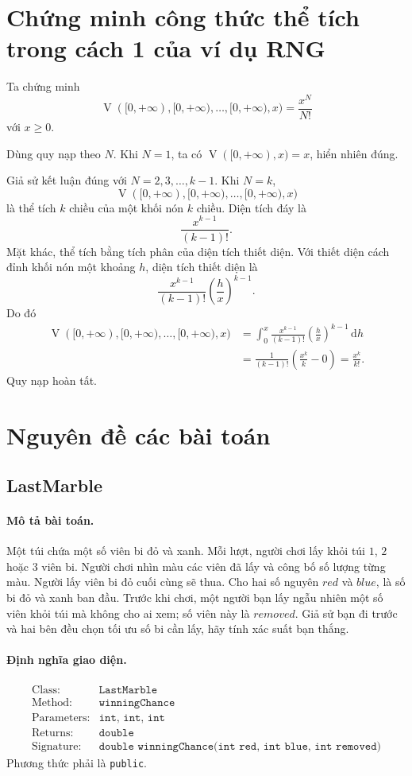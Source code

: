 \documentclass[11pt]{article}
\newcommand{\dd}{\,\mathrm{d}}
\newcommand{\Vol}{\operatorname{V}}
\begin{document}
\section{Chứng minh công thức thể tích trong cách 1 của ví dụ RNG}

Ta chứng minh
\[
  \Vol([0,+\infty),[0,+\infty),\ldots,[0,+\infty),x)
  =\frac{x^N}{N!}
\]
với \(x\ge 0\).

Dùng quy nạp theo \(N\). Khi \(N=1\), ta có \(\Vol([0,+\infty),x)=x\), hiển
nhiên đúng.

Giả sử kết luận đúng với \(N=2,3,\ldots,k-1\). Khi \(N=k\),
\[
  \Vol([0,+\infty),[0,+\infty),\ldots,[0,+\infty),x)
\]
là thể tích \(k\) chiều của một khối nón \(k\) chiều. Diện tích đáy là
\[
  \frac{x^{k-1}}{(k-1)!}.
\]
Mặt khác, thể tích bằng tích phân của diện tích thiết diện. Với thiết diện
cách đỉnh khối nón một khoảng \(h\), diện tích thiết diện là
\[
  \frac{x^{k-1}}{(k-1)!}\left(\frac{h}{x}\right)^{k-1}.
\]
Do đó
\[
\begin{aligned}
\Vol([0,+\infty),[0,+\infty),\ldots,[0,+\infty),x)
&=
\int_0^x
\frac{x^{k-1}}{(k-1)!}\left(\frac{h}{x}\right)^{k-1}\dd h\\
&=
\frac{1}{(k-1)!}\left(\frac{x^k}{k}-0\right)
=\frac{x^k}{k!}.
\end{aligned}
\]
Quy nạp hoàn tất.

\section{Nguyên đề các bài toán}

\subsection*{LastMarble}

\paragraph{Mô tả bài toán.}
Một túi chứa một số viên bi đỏ và xanh. Mỗi lượt, người chơi lấy khỏi túi
\(1\), \(2\) hoặc \(3\) viên bi. Người chơi nhìn màu các viên đã lấy và công
bố số lượng từng màu. Người lấy viên bi đỏ cuối cùng sẽ thua. Cho hai số
nguyên \(\mathit{red}\) và \(\mathit{blue}\), là số bi đỏ và xanh ban đầu.
Trước khi chơi, một người bạn lấy ngẫu nhiên một số viên khỏi túi mà không cho
ai xem; số viên này là \(\mathit{removed}\). Giả sử bạn đi trước và hai bên
đều chọn tối ưu số bi cần lấy, hãy tính xác suất bạn thắng.

\paragraph{Định nghĩa giao diện.}
\[
\begin{array}{ll}
\text{Class:} & \texttt{LastMarble}\\
\text{Method:} & \texttt{winningChance}\\
\text{Parameters:} & \texttt{int, int, int}\\
\text{Returns:} & \texttt{double}\\
\text{Signature:} & \texttt{double winningChance(int red, int blue, int removed)}
\end{array}
\]
Phương thức phải là \texttt{public}.
\end{document}
